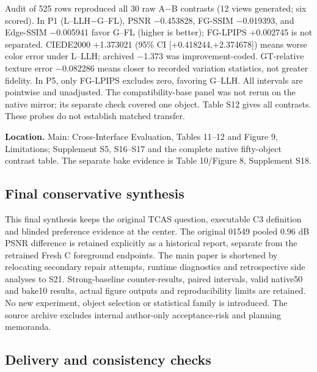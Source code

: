 \documentclass[
  10pt,
]{article}
\begin{document}
Audit of 525 rows reproduced all 30 raw A−B contrasts (12 views
generated; six scored). In P1 (L--LLH−G--FL), PSNR −0.453828, FG-SSIM
−0.019393, and Edge-SSIM −0.005941 favor G--FL (higher is better);
FG-LPIPS +0.002745 is not separated. CIEDE2000 +1.373021 (95\% CI
{[}+0.418244,+2.374678{]}) means worse color error under L--LLH;
archived −1.373 was improvement-coded. GT-relative texture error
−0.082286 means closer to recorded variation statistics, not greater
fidelity. In P5, only FG-LPIPS excludes zero, favoring G--LLH. All
intervals are pointwise and unadjusted. The compatibility-base panel was
not rerun on the native mirror; its separate check covered one object.
Table S12 gives all contrasts. These probes do not establish matched
transfer.

\textbf{Location.} Main: Cross-Interface Evaluation, Tables 11--12 and
Figure 9, Limitations; Supplement S5, S16--S17 and the complete native
fifty-object contrast table. The separate bake evidence is Table
10/Figure 8, Supplement S18.

\hypertarget{final-conservative-synthesis}{%
\subsection{Final conservative
synthesis}\label{final-conservative-synthesis}}

This final synthesis keeps the original TCAS question, executable C3
definition and blinded preference evidence at the center. The original
01549 pooled 0.96 dB PSNR difference is retained explicitly as a
historical report, separate from the retrained Fresh C foreground
endpoints. The main paper is shortened by relocating secondary repair
attempts, runtime diagnostics and retrospective side analyses to S21.
Strong-baseline counter-results, paired intervals, valid native50 and
bake10 results, actual figure outputs and reproducibility limits are
retained. No new experiment, object selection or statistical family is
introduced. The source archive excludes internal author-only
acceptance-risk and planning memoranda.

\hypertarget{delivery-and-consistency-checks}{%
\subsection{Delivery and consistency
checks}\label{delivery-and-consistency-checks}}
\end{document}
